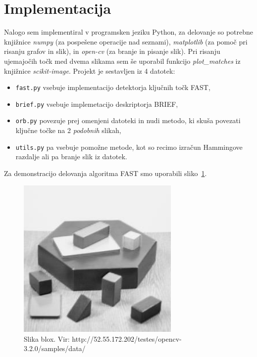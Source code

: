 \documentclass[a4paper,11pt]{article}
\begin{document}
\section{Implementacija}

Nalogo sem implementiral v programsken jeziku Python, za delovanje so potrebne knjižnice \textit{numpy} (za pospešene operacije nad seznami), \textit{matplotlib} (za pomoč pri risanju grafov in slik), in \textit{open-cv} (za branje in pisanje slik). Pri risanju ujemajočih točk med dvema slikama sem še uporabil funkcijo \textit{plot\_matches} iz knjižnice \textit{scikit-image}.
Projekt je sestavljen iz 4 datotek:
\begin{itemize}
	\item \texttt{fast.py} vsebuje implementacijo detektorja ključnih točk FAST,
	\item \texttt{brief.py} vsebuje implemetacijo deskriptorja BRIEF,
	\item \texttt{orb.py} povezuje prej omenjeni datoteki in nudi metodo, ki skuša povezati ključne točke na 2 \textit{podobnih} slikah,
	\item \texttt{utils.py} pa vsebuje pomožne metode, kot so recimo izračun Hammingove razdalje ali pa branje slik iz datotek.
\end{itemize}

Za demonstracijo delovanja algoritma FAST smo uporabili sliko~\ref{img:blox}.

\begin{figure}[hbp]
	\centering
	\includegraphics[width=0.7\textwidth]{images/blox}
	\caption{Slika blox. \small Vir: http://52.55.172.202/testes/opencv-3.2.0/samples/data/}
	\label{img:blox}
\end{figure}
\end{document}
